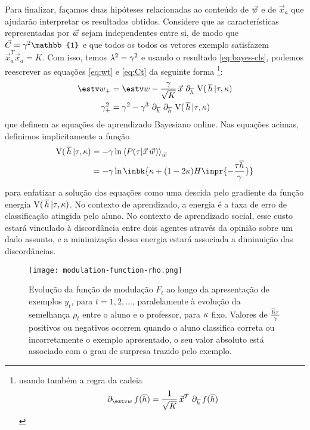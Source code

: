 \newcommand{\EV}{\ensuremath{\mathrm{V}(\,\htv\,|\tau,\ns)}}
\newcommand{\tgE}{\ensuremath{\gamma}} \newcommand{\gmT}{\ensuremath{\tgE_+}}
\newcommand{\gmt}{\ensuremath{\tgE}} Para finalizar, façamos duas hipóteses
relacionadas ao conteúdo de $\vec{w}$ e de $\vec{x}_a$ que ajudarão interpretar os
resultados obtidos.  Considere que as características representadas por $\vec{w}$
sejam independentes entre si, de modo que $\Ct = \tgE^2 \mathbb{1}$ e que todos
os todos os vetores exemplo satisfazem $\vec{x}_a^T\vec{x}_a = K$.  Com isso,
temos $\varh^2 = \tgE^2$ e usando o resultado \eqref{eq:bayes-cls}, podemos
reescrever as equações \eqref{eq:wt} e \eqref{eq:Ct} da seguinte
forma \footnote{usando também a regra da cadeia \[\delwt f(\htv) =
  \frac{1}{\sqrt{K}}\,\vec{x}^T\,\del{\htv} f(\htv)\]}:
\begin{align}
    \wT & = \wt - \frac{\gmt}{\sqrt{K}}\,\vec{x}\,\del{\htv}\,\EV \label{eq:wt-V} \\
    \gmT^2 & = \gmt^2 - \gmt^3\,\del{\htv}\del{\htv}\,\EV \label{eq:Ct-V}
\end{align}
que definem as equações de aprendizado Bayesiano online.
Nas equações acimas, definimos implicitamente a função
\begin{align}\label{eq:Vh}
    \EV & = - \gmt\ln \Ex{\lkl}_{\rl} \notag \\
    & = -\gmt\ln \inbk{\ns + (1-2\ns)H\inpr{-\frac{\tau\htv}{\gmt}}}
\end{align}
para enfatizar a solução das equações como uma descida pelo gradiente
da função energia $\EV$.  No contexto de aprendizado, a energia é a
taxa de erro de classificação atingida pelo aluno.  No contexto de
aprendizado social, esse custo estará vinculado à discordância entre
dois agentes através da opinião sobre um dado assunto, e a minimização
dessa energia estará associada a diminuição das discordâncias.

\begin{figure*}[h!]\label{fig:Frho}
  \caption{Evolução da função de modulação $F_t$ ao longo da
    apresentação de exemplos $y_t$, para $t=1,2,\dots$, paralelamente
    à evolução da semelhança $\rho_t$ entre o aluno e o professor,
    para $\kappa$ fixo. Valores de $\frac{\htv\tau}{\gmt}$ positivos ou
    negativos ocorrem quando o aluno classifica correta ou
    incorretamente o exemplo apresentado, o seu valor absoluto está
    associado com o grau de surpresa trazido pelo exemplo.}
  \centering \texttt{[image: modulation-function-rho.png]}
\end{figure*}

